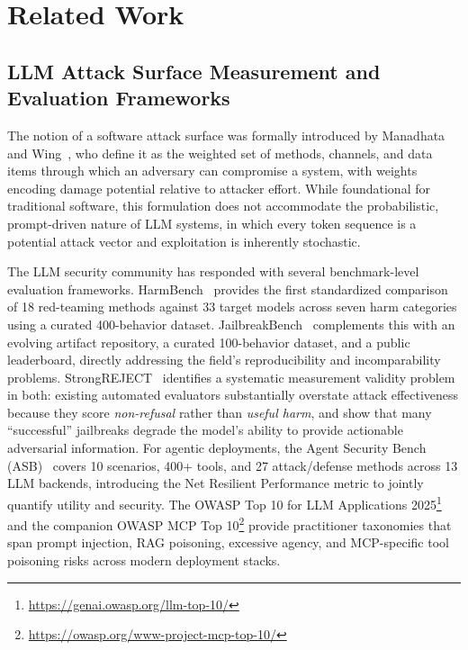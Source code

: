 
\section{Related Work}
\label{sec:related}

\subsection{LLM Attack Surface Measurement and Evaluation Frameworks}

The notion of a software attack surface was formally introduced by Manadhata
and Wing~\cite{manadhata2011attack}, who define it as the weighted set of
methods, channels, and data items through which an adversary can compromise a
system, with weights encoding damage potential relative to attacker effort.
While foundational for traditional software, this formulation does not
accommodate the probabilistic, prompt-driven nature of LLM systems, in which
every token sequence is a potential attack vector and exploitation is
inherently stochastic.

The LLM security community has responded with several benchmark-level
evaluation frameworks.
HarmBench~\cite{mazeika2024harmbench} provides the first standardized
comparison of 18 red-teaming methods against 33 target models across seven
harm categories using a curated 400-behavior dataset.
JailbreakBench~\cite{chao2024jailbreakbench} complements this with an evolving
artifact repository, a curated 100-behavior dataset, and a public leaderboard,
directly addressing the field's reproducibility and incomparability problems.
StrongREJECT~\cite{souly2024strongreject} identifies a systematic measurement
validity problem in both: existing automated evaluators substantially
overstate attack effectiveness because they score \emph{non-refusal} rather
than \emph{useful harm}, and show that many ``successful'' jailbreaks degrade
the model's ability to provide actionable adversarial information.
For agentic deployments, the Agent Security Bench
(ASB)~\cite{zhang2025asb} covers 10 scenarios, 400+ tools, and 27
attack/defense methods across 13 LLM backends, introducing the Net Resilient
Performance metric to jointly quantify utility and security.
The OWASP Top 10 for LLM Applications 2025\footnote{\url{https://genai.owasp.org/llm-top-10/}} and the
companion OWASP MCP Top 10\footnote{\url{https://owasp.org/www-project-mcp-top-10/}} provide practitioner
taxonomies that span prompt injection, RAG poisoning, excessive agency, and
MCP-specific tool poisoning risks across modern deployment stacks.


